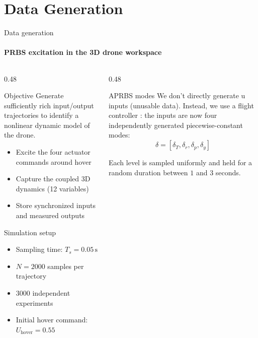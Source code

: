 \section{Data Generation}

\begin{frame}{Data generation}
    \framesubtitle{PRBS excitation in the 3D drone workspace}

    \begin{columns}[T,onlytextwidth]

        \begin{column}{0.48\textwidth}
            \begin{block}{Objective}
                Generate sufficiently rich input/output trajectories to
                identify a nonlinear dynamic model of the drone.
                \begin{itemize}
                    \item Excite the four actuator commands around hover
                    \item Capture the coupled 3D dynamics (12 variables)
                    \item Store synchronized inputs and measured outputs
                \end{itemize}
            \end{block}

            \begin{block}{Simulation setup}
                \begin{itemize}
                    \item Sampling time: $T_s = 0.05\,\mathrm{s}$
                    \item $N = 2000$ samples per trajectory
                    \item $3000$ independent experiments
                    \item Initial hover command: $U_{\mathrm{hover}} = 0.55$
                \end{itemize}
            \end{block}
        \end{column}

        \begin{column}{0.48\textwidth}
            \begin{block}{APRBS modes}
                We don't directly generate u inputs (unusable data).
                Instead, we use a flight controller : the inputs are now four independently generated piecewise-constant modes:
                \[
                    \delta = [\delta_T,\delta_r,\delta_p,\delta_y]
                \]

                Each level is sampled uniformly and held for a random duration
                between $1$ and $3$ seconds.
            \end{block}
        \end{column}
    \end{columns}
\end{frame}

